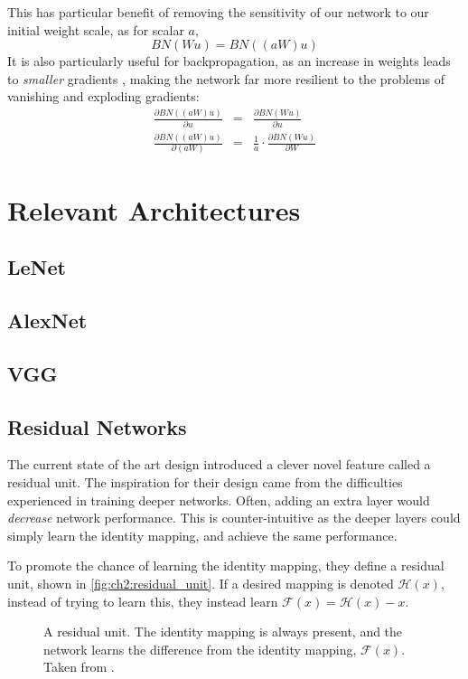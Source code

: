       This has particular benefit of removing the sensitivity of our network to
      our initial weight scale, as for scalar $a$,
      \begin{equation}
        BN(Wu) = BN((aW)u)
      \end{equation}
      It is also particularly useful for backpropagation, as an increase in
      weights leads to \emph{smaller} gradients \citep{ioffe_batch_2015}, making
      the network far more resilient to the problems of vanishing and exploding
      gradients:
      \begin{eqnarray}
        \frac{\partial BN((aW)u)}{\partial u} & = & \frac{\partial
        BN(Wu)}{\partial u} \nonumber\\
        \frac{\partial BN((aW)u)}{\partial (aW)} & = & \frac{1}{a} \cdot \frac{\partial
        BN(Wu)}{\partial W} 
      \end{eqnarray}


\section{Relevant Architectures}

\subsection{LeNet}
\subsection{AlexNet}
\subsection{VGG}
\subsection{Residual Networks}
  The current state of the art design introduced a clever novel feature called
  a residual unit\citep{he_deep_2015,he_identity_2016}. The inspiration for their design came from the difficulties
  experienced in training deeper networks. Often, adding an extra layer would
  \emph{decrease} network performance. This is counter-intuitive as the deeper
  layers could simply learn the identity mapping, and achieve the same
  performance.

  To promote the chance of learning the identity mapping, they define
  a residual unit, shown in \autoref{fig:ch2:residual_unit}. If a desired mapping
  is denoted $\mathcal{H}(x)$, instead of trying to learn this, they instead
  learn $\mathcal{F}(x) = \mathcal{H}(x) - x$. 
  \begin{figure}
    \centering
    \caption[The residual unit from ResNet]
          {A residual unit. The identity mapping is always present, and the
            network learns the difference from the identity mapping, $\mathcal{F}(x)$.
            Taken from \citep{he_deep_2015}.}
      \label{fig:ch2:residual_unit}
  \end{figure}


